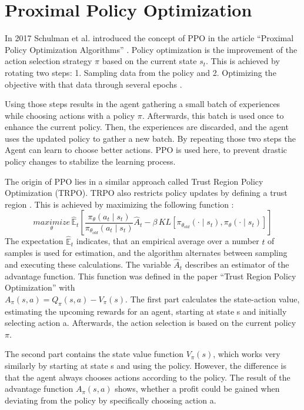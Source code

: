 \section{Proximal Policy Optimization}
In 2017 Schulman et al. introduced the concept of PPO in the article ``Proximal Policy Optimization Algorithms'' \cite{scwo17}.
Policy optimization is the improvement of the action selection strategy $\pi$ based on the current state $s_{t}$. This is achieved by rotating two steps: 1. Sampling data from the policy and 2. Optimizing the objective with that data through several epochs \cite{scwo17}.

Using those steps results in the agent gathering a small batch of experiences while choosing actions with a policy $\pi$. Afterwards, this batch is used once to enhance the current policy. Then, the experiences are discarded, and the agent uses the updated policy to gather a new batch. By repeating those two steps the Agent can learn to choose better actions. PPO is used here, to prevent drastic policy changes to stabilize the learning process.

The origin of PPO lies in a similar approach called Trust Region Policy Optimization (TRPO). TRPO also restricts policy updates by defining a trust region \cite{scle15}. This is achieved by maximizing the following function \cite{scwo17}:
\begin{equation}\label{eq:TRPO}
    \underset{\theta}{maximize}\,\hat{\mathbb{E}}_{t} \left[ \frac{\pi_{\theta}(a_{t} \mid s_{t})}{\pi_{\theta_{old}}(a_{t} \mid s_{t})}
        \hat{A}_{t}-\beta \, KL[\pi_{\theta_{old}}(\cdot \mid s_{t}),\pi_{\theta}(\cdot \mid s_{t})] \right]
\end{equation}
The expectation $\hat{\mathbb{E}}_{t}$ indicates, that an empirical average over a number $t$ of samples is used for estimation, and the algorithm alternates between sampling and executing these calculations. The variable $\hat{A}_{t}$ describes an estimator of the advantage function. This function was defined in the paper ``Trust Region Policy Optimization'' \cite{scle15} with \\ $A_\pi(s,a) = Q_\pi(s,a)-V_\pi(s)$. The first part calculates the state-action value, estimating the upcoming rewards for an agent, starting at state s and initially selecting action a. Afterwards, the action selection is based on the current policy $\pi$. 

The second part contains the state value function $V_\pi(s)$, which works very similarly by starting at state s and using the policy. However, the difference is that the agent always chooses actions according to the policy. The result of the advantage function $A_\pi(s,a)$ shows, whether a profit could be gained when deviating from the policy by specifically choosing action a.

